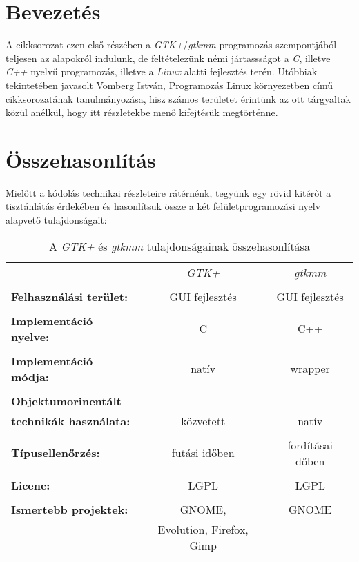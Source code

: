 \section{Bevezetés}

A cikksorozat ezen első részében a \textit{GTK+}/\textit{gtkmm} programozás szempontjából teljesen az alapokról indulunk, de feltételezünk némi jártassságot a \textit{C}, illetve \textit{C++} nyelvű programozás, illetve a \textit{Linux} alatti fejlesztés terén. Utóbbiak tekintetében javasolt Vomberg István, Programozás Linux környezetben című cikksorozatának tanulmányozása, hisz számos területet érintünk az ott tárgyaltak közül anélkül, hogy itt részletekbe menő kifejtésük megtörténne.

\section{Összehasonlítás}

Mielőtt a kódolás technikai részleteire rátérnénk, tegyünk egy rövid kitérőt a tisztánlátás érdekében és hasonlítsuk össze a két felületprogramozási nyelv alapvető tulajdonságait:\vspace{16pt}

\begin{table}[H]
\begin{center}
\begin{tabular}[t]{l c c}
                                       & \textit{GTK+}                     & \textit{gtkmm}   \\\\
\textbf{Felhasználási terület:}        & GUI fejlesztés                    & GUI fejlesztés   \\\\
\textbf{Implementáció nyelve:}         & C                                 & C++              \\\\
\textbf{Implementáció módja:}          & natív                             & wrapper          \\\\
\textbf{Objektumorinentált}            &                                   &                  \\
\textbf{technikák használata:}         & közvetett                         & natív            \\\\
\textbf{Típusellenőrzés:}              & futási időben                     & fordításai dőben \\\\
\textbf{Licenc:}                       & LGPL                              & LGPL             \\\\
\textbf{Ismertebb projektek:}          & GNOME,                            & GNOME            \\
                                       & Evolution, Firefox, Gimp          &                  \\
\end{tabular}
\caption{A \textit{GTK+} és \textit{gtkmm} tulajdonságainak összehasonlítása}
\end{center}
\end{table}


